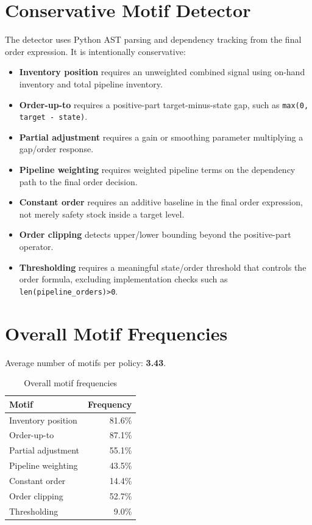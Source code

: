 \documentclass[11pt]{article}
\begin{document}
\section{Conservative Motif Detector}
The detector uses Python AST parsing and dependency tracking from the final order expression. It is intentionally conservative:
\begin{itemize}
  \item \textbf{Inventory position} requires an unweighted combined signal using on-hand inventory and total pipeline inventory.
  \item \textbf{Order-up-to} requires a positive-part target-minus-state gap, such as \texttt{max(0, target - state)}.
  \item \textbf{Partial adjustment} requires a gain or smoothing parameter multiplying a gap/order response.
  \item \textbf{Pipeline weighting} requires weighted pipeline terms on the dependency path to the final order decision.
  \item \textbf{Constant order} requires an additive baseline in the final order expression, not merely safety stock inside a target level.
  \item \textbf{Order clipping} detects upper/lower bounding beyond the positive-part operator.
  \item \textbf{Thresholding} requires a meaningful state/order threshold that controls the order formula, excluding implementation checks such as \texttt{len(pipeline\_orders)>0}.
\end{itemize}

\section{Overall Motif Frequencies}
Average number of motifs per policy: \textbf{3.43}.

\begin{table}[H]
\centering
\caption{Overall motif frequencies}
\begin{tabular}{lr}
\toprule
Motif & Frequency \\
\midrule
Inventory position & 81.6\% \\
Order-up-to & 87.1\% \\
Partial adjustment & 55.1\% \\
Pipeline weighting & 43.5\% \\
Constant order & 14.4\% \\
Order clipping & 52.7\% \\
Thresholding & 9.0\% \\
\bottomrule
\end{tabular}
\end{table}
\end{document}
